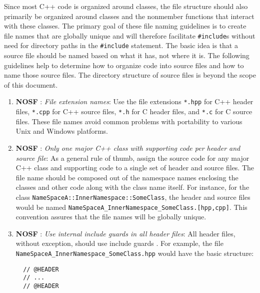 Since most C++ code is organized around classes, the file structure should
also primarily be organized around classes and the nonmember functions that
interact with these classes.  The primary goal of these file naming guidelines
is to create file names that are globally unique and will therefore facilitate
{}\texttt{\#include}s without need for directory paths in the
{}\texttt{\#include} statement.  The basic idea is that a source file should
be named based on what it has, not where it is.  The following guidelines help
to determine how to organize code into source files and how to name those
source files.  The directory structure of source files is beyond the scope of
this document.

\begin{enumerate}

{}\item{}\textbf{NOSF }:
{}\textit{File extension names}: Use the file extensions {}\texttt{*.hpp}
for C++ header files, {}\texttt{*.cpp} for C++ source files, {}\texttt{*.h}
for C header files, and {}\texttt{*.c} for C source files.  These file names
avoid common problems with portability to various Unix and Windows platforms.

{}\item{}\textbf{NOSF }: {}
{}\textit{Only one major C++ class with supporting code per header and
source file}: As a general rule of thumb, assign the source code for any major
C++ class and supporting code to a single set of header and source files.  The
file name should be composed out of the namespace names enclosing the classes
and other code along with the class name itself.  For instance, for the class
{}\texttt{NameSpaceA\-::InnerNamespace\-::SomeClass}, the header and source
files would be named
{}\texttt{NameSpaceA\-\_InnerNamespace\-\_SomeClass.[hpp,cpp]}.  This
convention assures that the file names will be globally unique.

{}\item{}\textbf{NOSF }: {}
{}\textit{Use internal include guards in all header files}: All header
files, without exception, should use include guards {}\cite[Item
24]{C++CodingStandards05}.  For example, the file
{}\texttt{NameSpaceA\-\_InnerNamespace\-\_SomeClass.hpp} would have the basic
structure:

{\small\begin{verbatim}
  // @HEADER
  // ...
  // @HEADER


\end{verbatim}}
\end{enumerate}
